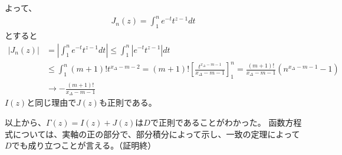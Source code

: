 よって、
\begin{align*}
    J_n(z)=\int_{1}^{n}e^{-t}t^{z-1}dt
\end{align*}
とすると
\begin{align*}
    |J_n(z)|&=\left|\int_{1}^{n}e^{-t}t^{z-1}dt\right|
    \le\int_{1}^{n}|e^{-t}t^{z-1}|dt\\
    &\le\int_{1}^{n}(m+1)!t^{x_\Delta-m-2}
    =(m+1)!\left[\frac{t^{x_\Delta-m-1}}{x_\Delta-m-1}\right]_1^n
    =\frac{(m+1)!}{x_\Delta-m-1}(n^{x_\Delta-m-1}-1)\\
    &\longrightarrow-\frac{(m+1)!}{x_\Delta-m-1}
\end{align*}
$I(z)$と同じ理由で$J(z)$も正則である。

以上から、$\Gamma(z)=I(z)+J(z)$は$D$で正則であることがわかった。
函数方程式については、実軸の正の部分で、部分積分によって示し、一致の定理によって$D$でも成り立つことが言える。（証明終）